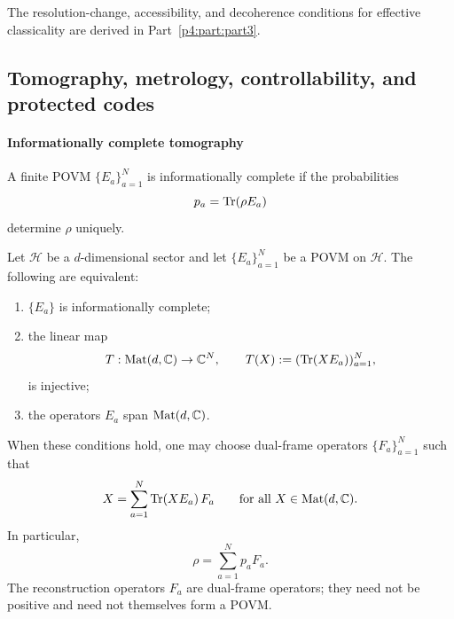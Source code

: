\documentclass[12pt,a4paper]{article}
\begin{document}
The resolution-change, accessibility, and decoherence conditions for effective classicality are derived in Part~\ref{p4:part:part3}.



\subsection{Tomography, metrology, controllability, and protected codes}
\label{p4:sec:part3-control}



\paragraph{Informationally complete tomography}
\label{p4:sec:part3-tomography}

A finite POVM $\{E_a\}_{a=1}^N$ is informationally complete if the probabilities
\begin{equation}
\label{p4:eq:ic-probs}
p_a=\operatorname{Tr}(\rho E_a)
\end{equation}
determine $\rho$ uniquely.


\begin{theorem}
\label{p4:thm:ic-reconstruction}
\leavevmode\par\noindent
Let \(\mathcal H\) be a \(d\)-dimensional sector and let
\(\{E_a\}_{a=1}^N\) be a POVM on \(\mathcal H\).  The following are equivalent:
\begin{enumerate}[label=(\roman*),leftmargin=2.2em]
\item \(\{E_a\}\) is informationally complete;
\item the linear map
\[
T:\mathrm{Mat}(d,\mathbb{C})\to \mathbb{C}^N,
\qquad
T(X):=(\operatorname{Tr}(XE_a))_{a=1}^N,
\]
is injective;
\item the operators \(E_a\) span \(\mathrm{Mat}(d,\mathbb{C})\).
\end{enumerate}
When these conditions hold, one may choose dual-frame operators \(\{F_a\}_{a=1}^N\) such that
\begin{equation}
\label{p4:eq:tomography}
X=\sum_{a=1}^N \operatorname{Tr}(XE_a)\,F_a
\qquad
\text{for all }X\in\mathrm{Mat}(d,\mathbb{C}).
\end{equation}
In particular,
\[
\rho=\sum_{a=1}^N p_aF_a.
\]
The reconstruction operators \(F_a\) are dual-frame operators; they need not be positive and need not themselves form a POVM.
\end{theorem}
\end{document}
